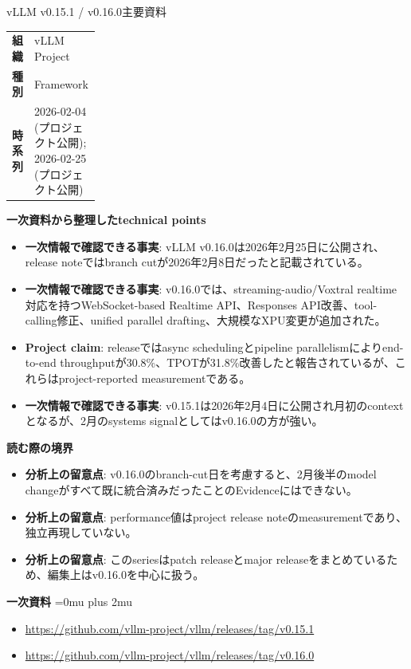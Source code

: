 \begin{technicalnote}{vLLM v0.15.1 / v0.16.0}{主要資料}
\begingroup
\begin{tabularx}{\linewidth}{@{}>{\bfseries}p{0.22\linewidth}X@{}}
組織 & vLLM Project \\
種別 & Framework \\
時系列 & 2026-02-04 (プロジェクト公開); 2026-02-25 (プロジェクト公開) \\
\end{tabularx}
\smallskip
{\bfseries 一次資料から整理したtechnical points}
\begin{itemize}[leftmargin=1.5em,itemsep=0.35em]
\item \textbf{一次情報で確認できる事実}: vLLM v0.16.0は2026年2月25日に公開され、release noteではbranch cutが2026年2月8日だったと記載されている。
\item \textbf{一次情報で確認できる事実}: v0.16.0では、streaming-audio/Voxtral realtime対応を持つWebSocket-based Realtime API、Responses API改善、tool-calling修正、unified parallel drafting、大規模なXPU変更が追加された。
\item \textbf{Project claim}: releaseではasync schedulingとpipeline parallelismによりend-to-end throughputが30.8\%、TPOTが31.8\%改善したと報告されているが、これらはproject-reported measurementである。
\item \textbf{一次情報で確認できる事実}: v0.15.1は2026年2月4日に公開され月初のcontextとなるが、2月のsystems signalとしてはv0.16.0の方が強い。
\end{itemize}
\begin{minipage}{\linewidth}
{\bfseries 読む際の境界}
\begin{itemize}[leftmargin=1.5em,itemsep=0.35em]
\item \textbf{分析上の留意点}: v0.16.0のbranch-cut日を考慮すると、2月後半のmodel changeがすべて既に統合済みだったことのEvidenceにはできない。
\item \textbf{分析上の留意点}: performance値はproject release noteのmeasurementであり、独立再現していない。
\item \textbf{分析上の留意点}: このseriesはpatch releaseとmajor releaseをまとめているため、編集上はv0.16.0を中心に扱う。
\end{itemize}
\begin{samepage}
{\bfseries 一次資料}
\begingroup\sloppy
\Urlmuskip=0mu plus 2mu\relax
\begin{itemize}[leftmargin=1.5em,itemsep=0.25em]
\item {\scriptsize\url{https://github.com/vllm-project/vllm/releases/tag/v0.15.1}}
\item {\scriptsize\url{https://github.com/vllm-project/vllm/releases/tag/v0.16.0}}
\end{itemize}
\endgroup
\end{samepage}
\end{minipage}
\endgroup
\end{technicalnote}
\medskip

